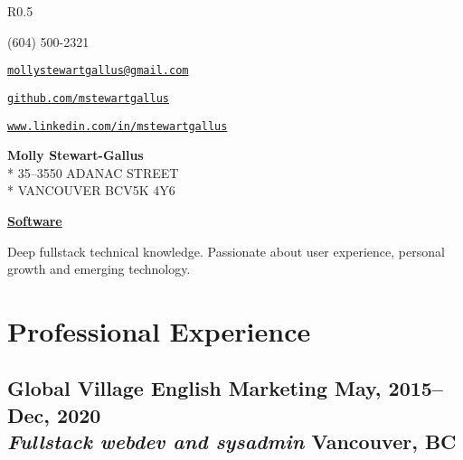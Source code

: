 \documentclass[oneside]{scrartcl}
\makeatletter
\newcommand{\experience}[4]{
  \subsection[#1]{#1 \hfill \small #4 \\
  \textmd{\textit{#2} \hfill #3}}}
\newcommand{\email}{mollystewartgallus@gmail.com}
\newcommand{\github}{github.com/mstewartgallus}
\newcommand{\linkedin}{www.linkedin.com/in/mstewartgallus}
\makeatother
\begin{document}
{
\begin{wrapfigure}{R}{0.5\textwidth}
  \raggedright
\begin{description}[nosep]
\item[Phone] (604) 500-2321
\item[Email] \href{mailto://\email}{\nolinkurl{\email}}
\item[GitHub] \href{https://\github}{\nolinkurl{\github}}
\item[LinkedIn] \href{https://\linkedin}{\nolinkurl{\linkedin}}
\end{description}
\end{wrapfigure}


{\Large \textbf{Molly Stewart-Gallus}}\\*
35--3550 ADANAC STREET\\*
VANCOUVER BC\hspace{0.5em}V5K 4Y6
}

\bigskip

\underline{\textbf{\LARGE{}Software}}

\bigskip

Deep fullstack technical knowledge. Passionate about user experience,
personal growth and emerging technology.

\section{Professional Experience}
\experience{Global Village English Marketing}
{Fullstack webdev and sysadmin}{Vancouver, BC}{May, 2015--Dec, 2020}
\end{document}
